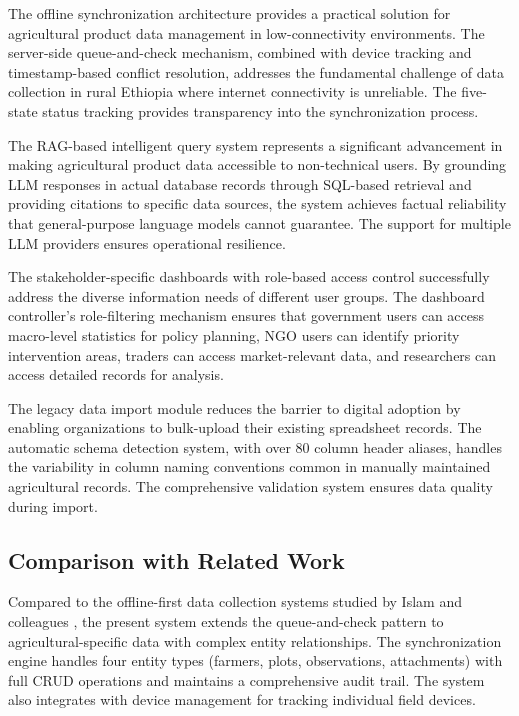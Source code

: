 The offline synchronization architecture provides a practical solution for agricultural product data management in low-connectivity environments. The server-side queue-and-check mechanism, combined with device tracking and timestamp-based conflict resolution, addresses the fundamental challenge of data collection in rural Ethiopia where internet connectivity is unreliable. The five-state status tracking provides transparency into the synchronization process.

The RAG-based intelligent query system represents a significant advancement in making agricultural product data accessible to non-technical users. By grounding LLM responses in actual database records through SQL-based retrieval and providing citations to specific data sources, the system achieves factual reliability that general-purpose language models cannot guarantee. The support for multiple LLM providers ensures operational resilience.

The stakeholder-specific dashboards with role-based access control successfully address the diverse information needs of different user groups. The dashboard controller's role-filtering mechanism ensures that government users can access macro-level statistics for policy planning, NGO users can identify priority intervention areas, traders can access market-relevant data, and researchers can access detailed records for analysis.

The legacy data import module reduces the barrier to digital adoption by enabling organizations to bulk-upload their existing spreadsheet records. The automatic schema detection system, with over 80 column header aliases, handles the variability in column naming conventions common in manually maintained agricultural records. The comprehensive validation system ensures data quality during import.

\subsection{Comparison with Related Work}

Compared to the offline-first data collection systems studied by Islam and colleagues \cite{islam2021}, the present system extends the queue-and-check pattern to agricultural-specific data with complex entity relationships. The synchronization engine handles four entity types (farmers, plots, observations, attachments) with full CRUD operations and maintains a comprehensive audit trail. The system also integrates with device management for tracking individual field devices.

